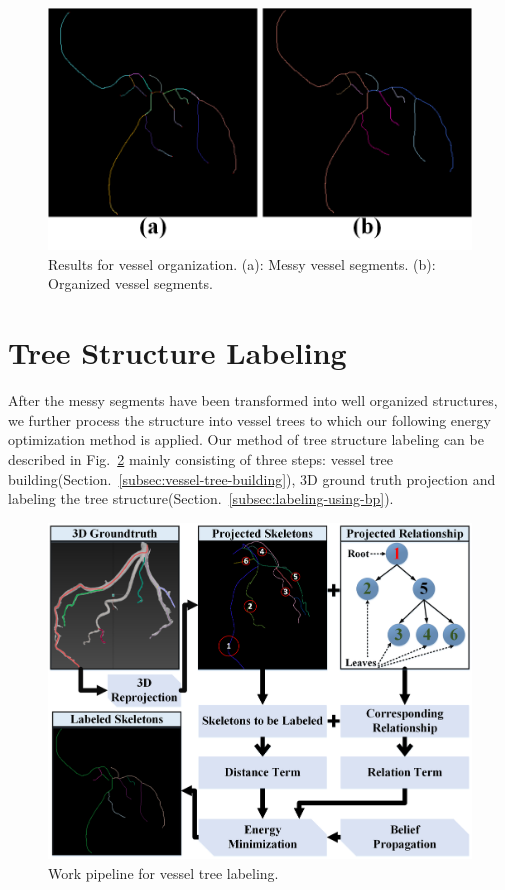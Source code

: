 \documentclass[journal]{IEEEtran}
\begin{document}
\begin{figure}[!t]
\centering
\includegraphics[width=1.0\linewidth]{./images/segments_orga_result.png}
\caption{Results for vessel organization. (a): Messy vessel segments. (b): Organized vessel segments.}
\label{fig:segments_orga_result}
\end{figure}

\section{Tree Structure Labeling}
\label{sec:tree-labeling}
After the messy segments have been transformed into well organized structures, we further process the structure into vessel trees to which our following energy optimization method is applied. Our method of tree structure labeling can be described in Fig.~\ref{fig:tree-labeling} mainly consisting of three steps: vessel tree building(Section.~\ref{subsec:vessel-tree-building}), 3D ground truth projection and labeling the tree structure(Section.~\ref{subsec:labeling-using-bp}).

\begin{figure}[!t]
\centering
\includegraphics[width=1.0\linewidth]{./images/labeling-pipeline.png}
\caption{Work pipeline for vessel tree labeling.}
\label{fig:tree-labeling}
\end{figure}
\end{document}
